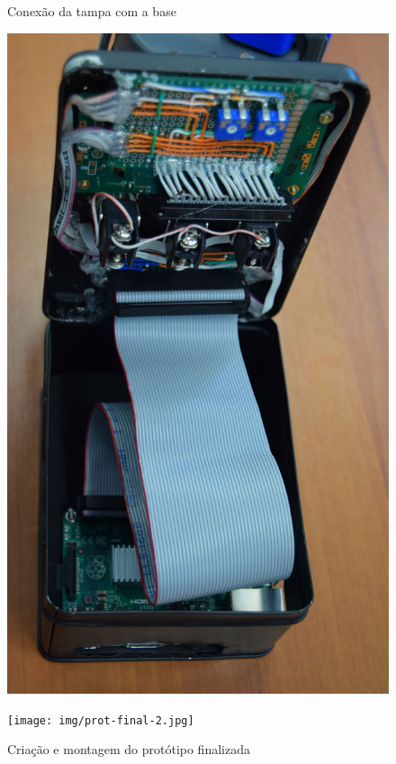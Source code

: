 \documentclass[
		12pt,				%
		openright,			%
		oneside,			%
		a4paper,			%
		chapter=TITLE,		%
		english,			%
		brazil				%
	]{abntex2}
\begin{document}
\begin{figure}[htb]
	\centering
 	\begin{minipage}{0.45\textwidth}
		\centering
		\caption{\label{fig:tampa-base}Conexão da tampa com a base}
		\includegraphics[width=1\textwidth]{img/tampa-base.jpg}
	\end{minipage}
	\hfill
	\begin{minipage}{0.45\textwidth}
		\centering
		\caption{\label{fig:prot-final}Criação e montagem do protótipo finalizada}
		\texttt{[image: img/prot-final-2.jpg]}
	\end{minipage}
\end{figure}
\end{document}
